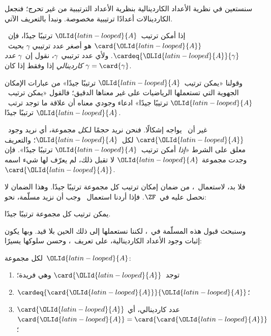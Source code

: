 \documentclass[../../../include/open-logic-section]{subfiles}
\begin{document}

سنستعين في نظرية الأعداد الكاردينالية بنظرية الأعداد الترتيبية من غير
تحرج؛ فنجعل الكاردينالات أعدادًا ترتيبية مخصوصة. ونبدأ بالتعريف الآتي.

\begin{defn}
إذا أمكن ترتيب~${\OLId{latin-looped}{A}}$ ترتيبًا جيدًا، فإن~$\card{{\OLId{latin-looped}{A}}}$ هو أصغر عدد ترتيبي
$\gamma$ بحيث~$\cardeq{{\OLId{latin-looped}{A}}}{\gamma}$. ولأي عدد ترتيبي~$\gamma$، نقول
إن~$\gamma$ \emph{عدد كاردينالي} إذا وفقط إذا كان
$\gamma = \card{\gamma}$.
\end{defn}

وقولنا «يمكن ترتيب~${\OLId{latin-looped}{A}}$ ترتيبًا جيدًا» من عبارات الإمكان الجهوية التي
تستعملها الرياضيات على غير معناها الدقيق؛ فالقول «يمكن ترتيب~${\OLId{latin-looped}{A}}$
ترتيبًا جيدًا» ادعاء وجودي معناه أن علاقة ما توجد ترتب~${\OLId{latin-looped}{A}}$ ترتيبًا
جيدًا.

غير أن~ يواجه إشكالًا. فنحن نريد حجمًا
لـ\emph{كل} مجموعة، أي نريد وجود~$\card{{\OLId{latin-looped}{A}}}$ لكل~${\OLId{latin-looped}{A}}$؛ والتعريف معلق
على الشرط «\emph{إذا} أمكن ترتيب~${\OLId{latin-looped}{A}}$ ترتيبًا جيدًا». فإن وجدت مجموعة
${\OLId{latin-looped}{A}}$ لا تقبل ذلك، لم يعرّف لها شيء اسمه~$\card{{\OLId{latin-looped}{A}}}$.

فلا بد، لاستعمال~، من ضمان إمكان ترتيب كل
مجموعة ترتيبًا جيدًا. وهذا الضمان لا نحصل عليه في~$\ZF$. فإذا أردنا
استعمال~ وجب أن نزيد مسلّمة، نحو:
\begin{axiom}
يمكن ترتيب كل مجموعة ترتيبًا جيدًا.
\end{axiom}
وسنبحث قبول هذه المسلّمة في~، لكننا نستعملها
إلى ذلك الحين بلا قيد. وبها يكون إثبات وجود الأعداد الكاردينالية، على
تعريف~، وحسن سلوكها يسيرًا:

\begin{lem}
لكل مجموعة~${\OLId{latin-looped}{A}}$:
\begin{enumerate}
	\item{} توجد~$\card{{\OLId{latin-looped}{A}}}$ وهي فريدة؛
	\item{} $\cardeq{\card{{\OLId{latin-looped}{A}}}}{{\OLId{latin-looped}{A}}}$؛
	\item{} $\card{{\OLId{latin-looped}{A}}}$ عدد كاردينالي، أي
	$\card{{\OLId{latin-looped}{A}}} = \card{\card{{\OLId{latin-looped}{A}}}}$؛
\end{enumerate}
\end{lem}
\end{document}
